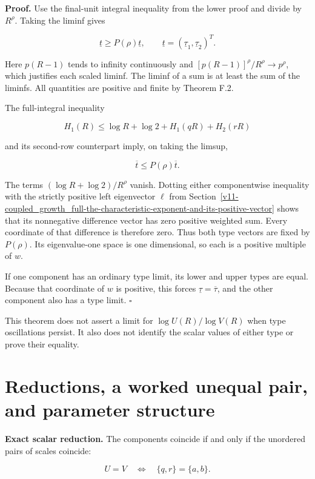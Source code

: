 \textbf{Proof.} Use the final-unit integral inequality from the lower
proof and divide by \(R^\rho\). Taking the liminf gives

\[
\underline t\ge P(\rho)\underline t,
\qquad
\underline t=(\underline\tau_1,\underline\tau_2)^T.
\]

Here \(p(R-1)\) tends to infinity continuously and
\([p(R-1)]^\rho/R^\rho\to p^\rho\), which justifies each scaled liminf.
The liminf of a sum is at least the sum of the liminfs. All quantities
are positive and finite by Theorem F.2.

The full-integral inequality

\[
H_1(R)\le\log R+\log2+H_1(qR)+H_2(rR)
\]

and its second-row counterpart imply, on taking the limsup,

\[
\overline t\le P(\rho)\overline t.
\]

The terms \((\log R+\log2)/R^\rho\) vanish. Dotting either componentwise
inequality with the strictly positive left eigenvector \(\ell\) from
Section~\ref{v11-coupled_growth_full-the-characteristic-exponent-and-its-positive-vector} shows that its nonnegative difference vector has zero positive
weighted sum. Every coordinate of that difference is therefore zero.
Thus both type vectors are fixed by \(P(\rho)\). Its eigenvalue-one
space is one dimensional, so each is a positive multiple of \(w\).

If one component has an ordinary type limit, its lower and upper types
are equal. Because that coordinate of \(w\) is positive, this forces
\(\underline\tau=\overline\tau\), and the other component also has a
type limit. \(\square\)

This theorem does not assert a limit for \(\log U(R)/\log V(R)\) when
type oscillations persist. It also does not identify the scalar values
of either type or prove their equality.

\hypertarget{v11-coupled_growth_full-reductions-a-worked-unequal-pair-and-parameter-structure}{%
\section{Reductions, a worked unequal pair, and parameter
structure}\label{v11-coupled_growth_full-reductions-a-worked-unequal-pair-and-parameter-structure}}

\textbf{Exact scalar reduction.} The components coincide if and only if
the unordered pairs of scales coincide:

\[
U=V\quad\Longleftrightarrow\quad\{q,r\}=\{a,b\}.
\]

